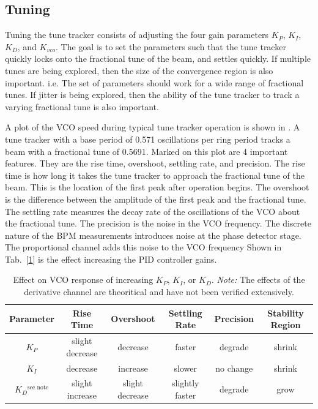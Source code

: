 \subsection{Tuning \label{Tuning}} Tuning the tune tracker consists of
adjusting the four gain parameters $K_P$, $K_I$, $K_D$, and $K_{vco}$.
The goal is to set the parameters such that the tune tracker quickly
locks onto the fractional tune of the beam, and settles quickly.  If
multiple tunes are being explored, then the size of the convergence
region is also important.  i.e.  The set of parameters should work for
a wide range of fractional tunes.  If jitter is being explored, then
the ability of the tune tracker to track a varying fractional tune is
also important.

A plot of the VCO speed during typical tune tracker operation is shown
in .  A tune tracker with a base period of 0.571
oscillations per ring period tracks a beam with a fractional tune of
0.5691.  Marked on this plot are 4 important features.  They are the
rise time, overshoot, settling rate, and precision.  The rise time is
how long it takes the tune tracker to approach the fractional tune of
the beam.  This is the location of the first peak after operation
begins.  The overshoot is the difference between the amplitude of the
first peak and the fractional tune.  The settling rate measures the
decay rate of the oscillations of the VCO about the fractional tune.
The precision is the noise in the VCO frequency.  The discrete nature
of the BPM measurements introduces noise at the phase detector stage.
The proportional channel adds this noise to the VCO frequency Shown in
Tab.~[\ref{t:pid-params}] is the effect increasing the PID controller
gains.

\begin{table}
\begin{tabular}{|c|ccccc|}
\hline
Parameter&  Rise Time&        Overshoot&        Settling Rate&      Precision&  Stability Region\\
\hline
$K_P$&      slight decrease&  decrease&         faster&             degrade&    shrink\\
$K_I$&      decrease&         increase&         slower&             no change&  shrink\\
$K_D$$^\textrm{see note}$&    slight increase&  slight decrease&  slightly faster&    degrade&    grow\\ 
\hline
\end{tabular}
\caption[Effect on VCO response of increasing $K_P$, $K_I$, or $K_D$.]{
Effect on VCO response of increasing $K_P$, $K_I$, or $K_D$. 
{\it Note:} The effects of the derivative channel are theoritical and have not 
been verified extensively.}
\label{t:pid-params}
\end{table}

